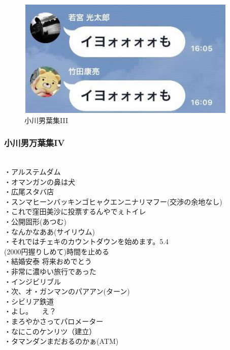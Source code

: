 \documentclass[12pt]{jsarticle}
\begin{document}
\begin{figure}[H]
\centering
\includegraphics[clip,scale=0.5]{./picture/iii}
    \caption{小川男葉集III}
    \label{iii}
\end{figure}



\newpage
\subsubsection{小川男万葉集IV}
　\\
・アルステムダム\\
・オマンガンの鼻は犬\\
・広尾スタバ店\\
・スンマヒーンバッキンゴヒャクエンニナリマフー(交渉の余地なし)\\
・これで窪田美沙に投票するんやでぇトイレ\\
・公開固形(あつむ)\\
・なんかなああ(サイリウム)\\
・それではチェキのカウントダウンを始めます。5.4\\
    (2000円握りしめて)時間を止める\\
・結婚安泰 将来おめでとう\\
・非常に濃ゆい旅行であった\\
・インジビリブル\\
・次、オ・ガンマンのパアアン(ターン)\\
・シビリア鉄道\\
・よし。   \ \      え？\\
・まろやかさってパロメーター\\
・なにこのケンリツ（建立）\\
・タマンダンまだおるのかぁ(ATM)\\

\newpage
\end{document}

